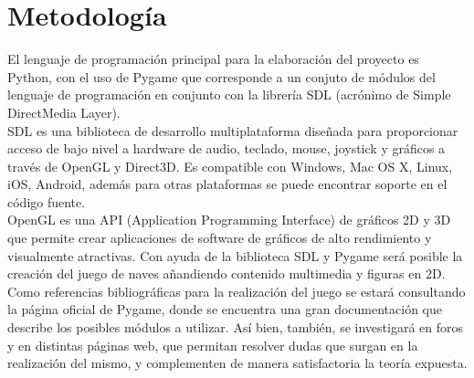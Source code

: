 \documentclass[12pt,letterpaper]{article}
\begin{document}
 \section{Metodología} 
 El lenguaje de programación principal para la elaboración del proyecto es Python, con el uso de Pygame que corresponde a un conjuto de módulos del lenguaje de programación en conjunto con la librería SDL (acrónimo de Simple DirectMedia Layer). \vspace{5mm}\\
 \indent SDL es una biblioteca de desarrollo multiplataforma diseñada para proporcionar acceso de bajo nivel a hardware de audio, teclado, mouse, joystick y gráficos a través de OpenGL y Direct3D. Es compatible con Windows, Mac OS X, Linux, iOS, Android, además para otras plataformas se puede encontrar soporte en el código fuente.
\vspace{5mm} \\
\indent OpenGL es una API (Application Programming Interface) de gráficos 2D y 3D que permite crear aplicaciones de software de gráficos de alto rendimiento y visualmente atractivas. Con ayuda de la biblioteca SDL y Pygame será posible la creación del juego de naves añandiendo contenido multimedia y figuras en 2D. \vspace{5mm} \\
\indent Como referencias bibliográficas para la realización del juego se estará consultando la página oficial de Pygame, donde se encuentra una gran documentación que describe los posibles módulos a utilizar. Así bien, también, se investigará en foros y en distintas páginas web, que permitan resolver dudas que surgan en la realización del mismo, y complementen de manera satisfactoria la teoría expuesta.



  
\end{document}
